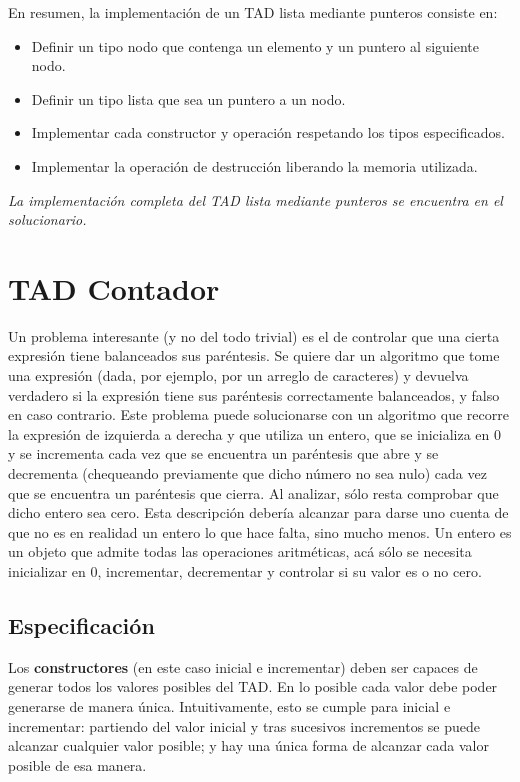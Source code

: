 En resumen, la implementación de un TAD lista mediante punteros consiste en:
\begin{itemize}
    \item Definir un tipo nodo que contenga un elemento y un puntero al siguiente nodo.
    \item Definir un tipo lista que sea un puntero a un nodo.
    \item Implementar cada constructor y operación respetando los tipos especificados.
    \item Implementar la operación de destrucción liberando la memoria utilizada.
\end{itemize}

\textit{La implementación completa del TAD lista mediante punteros se encuentra en el solucionario.}

\section{TAD Contador}
Un problema interesante (y no del todo trivial) es el de controlar que una cierta expresión tiene balanceados sus paréntesis. Se quiere dar un algoritmo que tome una expresión (dada, por ejemplo, por un arreglo de caracteres) y devuelva verdadero si la expresión tiene sus paréntesis correctamente balanceados, y falso en caso contrario.
Este problema puede solucionarse con un algoritmo que recorre la expresión de izquierda a derecha y que utiliza un entero, que se inicializa en 0 y se incrementa cada vez que se encuentra un paréntesis que abre y se decrementa (chequeando previamente que dicho número no sea nulo) cada vez que se encuentra un paréntesis que cierra. Al analizar, sólo resta comprobar que dicho entero sea cero. Esta descripción debería alcanzar para darse uno cuenta de que no es en realidad un entero lo que hace falta, sino mucho menos. Un entero es un objeto que admite todas las operaciones aritméticas, acá sólo se necesita inicializar en 0, incrementar, decrementar y controlar si su valor es o no cero.

\subsection{Especificación}
Los \textbf{constructores} (en este caso inicial e incrementar) deben ser capaces de generar todos los valores posibles del TAD. En lo posible cada valor debe poder generarse de manera única. Intuitivamente, esto se cumple para inicial e incrementar: partiendo del valor inicial y tras sucesivos incrementos se puede alcanzar cualquier valor posible; y hay una única forma de alcanzar cada valor posible de esa manera.

